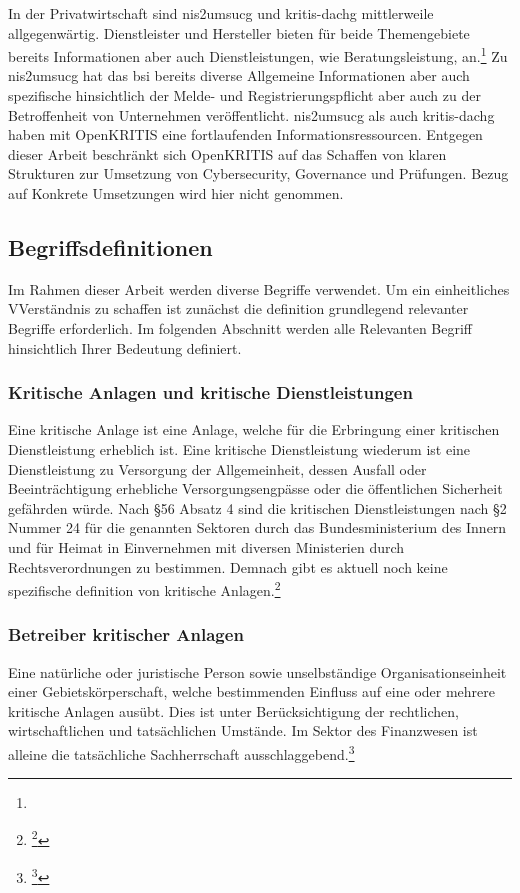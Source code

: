 \documentclass[11pt,a4paper,hidelinks]{article}   %
\begin{document}
        In der Privatwirtschaft sind \gls{nis2umsucg} und \gls{kritis-dachg} mittlerweile allgegenwärtig. Dienstleister und Hersteller bieten für beide Themengebiete bereits Informationen aber auch Dienstleistungen, wie Beratungsleistung, an.\footnote{

        } Zu \gls{nis2umsucg} hat das \gls{bsi} bereits diverse Allgemeine Informationen aber auch spezifische hinsichtlich der Melde- und Registrierungspflicht aber auch zu der Betroffenheit von Unternehmen veröffentlicht. \gls{nis2umsucg} als auch \gls{kritis-dachg} haben mit OpenKRITIS eine fortlaufenden Informationsressourcen. Entgegen dieser Arbeit beschränkt sich OpenKRITIS auf das Schaffen von klaren Strukturen zur Umsetzung von Cybersecurity, Governance und Prüfungen. Bezug auf Konkrete Umsetzungen wird hier nicht genommen.
        
        \subsection{Begriffsdefinitionen}
        Im Rahmen dieser Arbeit werden diverse Begriffe verwendet. Um ein einheitliches VVerständnis zu schaffen ist zunächst die definition grundlegend relevanter Begriffe erforderlich. Im folgenden Abschnitt werden alle Relevanten Begriff hinsichtlich Ihrer Bedeutung definiert.       
            \subsubsection{Kritische Anlagen und kritische Dienstleistungen}
            Eine kritische Anlage ist eine Anlage, welche für die Erbringung einer kritischen Dienstleistung erheblich ist. Eine kritische Dienstleistung wiederum ist eine Dienstleistung zu Versorgung der Allgemeinheit, dessen Ausfall oder Beeinträchtigung erhebliche Versorgungsengpässe oder die öffentlichen Sicherheit gefährden würde. Nach §56 Absatz 4 sind die kritischen Dienstleistungen nach §2 Nummer 24 für die genannten Sektoren durch das Bundesministerium des Innern und für Heimat in Einvernehmen mit diversen Ministerien durch Rechtsverordnungen zu bestimmen. Demnach gibt es aktuell noch keine spezifische definition von kritische Anlagen.\footnote{
                \footcite[§2 Nummer 22 und 24 sowie §56 Absatz 4][]{NIS2UmsuCG}
            }

            \subsubsection{Betreiber kritischer Anlagen}\label{def:BetreiberKritischerAnlage}
            Eine natürliche oder juristische Person sowie unselbständige Organisationseinheit einer Gebietskörperschaft, welche bestimmenden Einfluss auf eine oder mehrere kritische Anlagen ausübt. Dies ist unter Berücksichtigung der rechtlichen, wirtschaftlichen und tatsächlichen Umstände. Im Sektor des Finanzwesen ist alleine die tatsächliche Sachherrschaft  ausschlaggebend.\footnote{
                \footcite[§28 Absatz 7][]{NIS2UmsuCG}
            }
\end{document}
